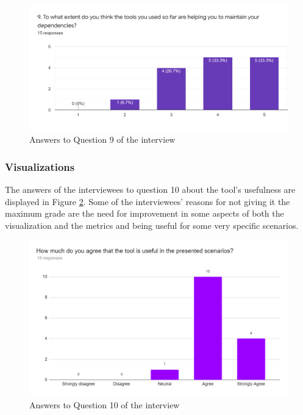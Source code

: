 \begin{figure}[ht!]
\begin{center}
\includegraphics[width=\textwidth]{figures/interview/Question9.png}
\caption{Answers to Question 9 of the interview}
\label{fig:interview-9}
\end{center}
\end{figure}

\subsubsection{Visualizations}

The answers of the interviewees to question 10 about the tool's usefulness are displayed in Figure \ref{fig:interview-10}. Some of the interviewees' reasons for not giving it the maximum grade are the need for improvement in some aspects of both the visualization and the metrics and being useful for some very specific scenarios.

\begin{figure}[ht!]
\begin{center}
\includegraphics[width=\textwidth]{figures/interview/Question10.png}
\caption{Answers to Question 10 of the interview}
\label{fig:interview-10}
\end{center}
\end{figure}

